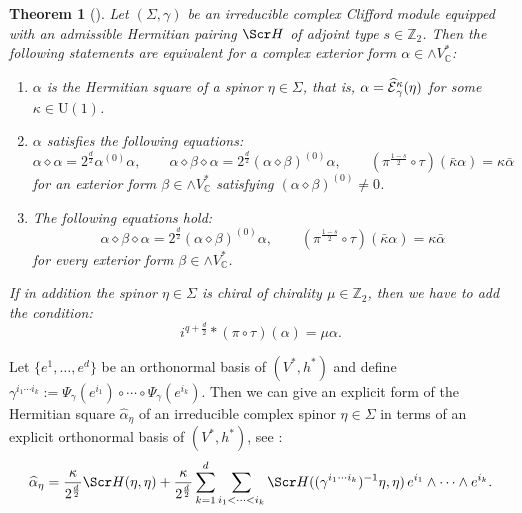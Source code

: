 \documentclass[10pt,a4paper,twoside,reqno]{amsart}
\theoremstyle{plain}
\newtheorem{thm}{Theorem}[section]
\theoremstyle{definition}
\theoremstyle{remark}
\def\Z{\mathbb{Z}}
\def\C{\mathbb{C}}
\def\scS{\Scr H}
\def\U{\mathrm{U}}
\def\hcE{\smash{\widehat{\mathcal{E}}}}
\begin{document}
\begin{thm}[{\cite[Thm.\ 3.13 and Cor.\ 3.23]{Algebraic_Complex_Square_2025}}]\label{thm:even_Hermitian_forms}
    Let $(\Sigma,\gamma)$ be an irreducible complex Clifford module equipped with an admissible Hermitian pairing $\scS$ of adjoint type $s\in \mathbb{Z}_2$. Then the following statements are equivalent for a complex exterior form $\alpha\in\wedge V^*_\C$: \begin{enumerate}
        \item[\normalfont(a)] $\alpha$ is the Hermitian square of a spinor $\eta\in\Sigma$, that is, $\alpha = \hcE_\gamma^\kappa(\eta)$ for some $\kappa\in\U(1)$.
        \item[\normalfont(b)] $\alpha$ satisfies the following equations: $$\alpha\diamond\alpha = 2^{\frac{d}{2}}\alpha^{(0)}\alpha,\qquad \alpha \diamond \beta \diamond \alpha=2^{\frac{d}{2}}(\alpha\diamond\beta)^{(0)}\alpha,\qquad(\pi^{\frac{1-s}{2}}\circ\tau)(\bar\kappa\alpha) = \kappa \bar{\alpha}$$ for an exterior form $\beta\in\wedge V^*_\C$ satisfying $(\alpha\diamond\beta)^{(0)}\neq0$.
        \item[\normalfont(c)] The following equations hold: $$\alpha \diamond \beta \diamond \alpha=2^{\frac{d}{2}}(\alpha\diamond\beta)^{(0)}\alpha,\qquad(\pi^{\frac{1-s}{2}}\circ\tau)(\bar\kappa\alpha) = \kappa \bar{\alpha}$$ for every exterior form $\beta\in\wedge V^*_\C$.
    \end{enumerate}

    If in addition the spinor $\eta\in\Sigma$ is chiral of chirality $\mu\in\Z_2$, then we have to add the condition: $$i^{q+\frac{d}{2}}*(\pi\circ\tau)(\alpha)=\mu\alpha.$$
\end{thm}

Let $\{e^1,\ldots, e^d\}$ be an orthonormal basis of $(V^*,h^*)$ and define $\gamma^{i_1\cdots i_k}:=\Psi_\gamma(e^{i_1})\circ\cdots\circ\Psi_\gamma(e^{i_k})$. Then we can give an explicit form of the Hermitian square $\widehat{\alpha}_\eta$ of an irreducible complex spinor $\eta\in\Sigma$ in terms of an explicit orthonormal basis of $(V^*,h^*)$, see \cite[Eq.\ 10]{Algebraic_Complex_Square_2025}: \begin{equation*}\label{eq:explicitHermitian}
    \widehat{\alpha}_{\eta} = \frac{\kappa}{2^{\frac{d}{2}}} \scS(\eta,\eta) + \frac{\kappa}{2^{\frac{d}{2}}} \sum_{k=1}^d \sum_{i_1 < \cdots < i_k} \scS((\gamma^{i_1 \cdots i_k})^{-1}\eta , \eta)\, e^{i_1}\wedge  \cdots \wedge e^{i_k}.
\end{equation*}
\end{document}
